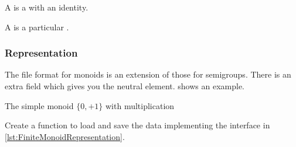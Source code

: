 
A \Monoid is a \Semigroup with an identity.


A \FiniteMonoid is a particular \FiniteSemigroup.


\subsubsection*{Representation}

The file format for monoids is an extension of those for semigroups.
There is an extra field  which gives you the neutral element.
 shows an example.

\begin{marginfigure}%
    \caption{The simple monoid $\{0,+1\}$ with multiplication}%
    \label{fig:monoid2}%
\end{marginfigure}%

\begin{codeexercise}
    Create a function to load and save the data implementing the
    interface in \cref{lst:FiniteMonoidRepresentation}.
\end{codeexercise}


